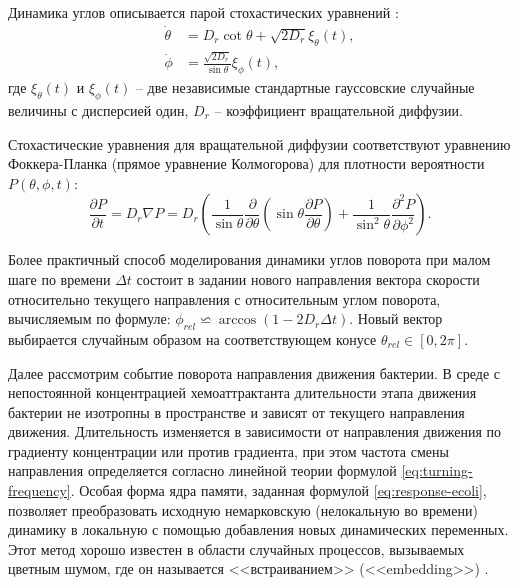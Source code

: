 Динамика углов описывается парой стохастических уравнений \cite{marino_dynamics_2019}:
\begin{equation}
    \begin{aligned}
	\dot{\theta} &= D_r\cot\theta +\sqrt{2D_r}\xi_{\theta}(t),\\
	\dot{\phi} &= \frac{\sqrt{2D_r}}{\sin\theta}\xi_{\phi}(t),
    \end{aligned}
    \label{eq:bacteria-angle-equations}
\end{equation}
где $\xi_{\theta}(t)$ и $\xi_{\phi}(t)$ -- две независимые стандартные гауссовские случайные величины с дисперсией один, $D_r$ -- коэффициент вращательной диффузии.

Стохастические уравнения для вращательной диффузии соответствуют уравнению Фоккера-Планка (прямое уравнение Колмогорова) для плотности вероятности $P(\theta,\phi,t)$:
\begin{equation}
	\frac{\partial P}{\partial t} = D_r \nabla P = 
	D_r \left ( \frac{1}{\sin \theta}\frac{\partial}{\partial \theta} \left (\sin\theta \frac{\partial P}{\partial \theta}\right ) + \frac{1}{\sin^2 \theta}\frac{\partial^2 P}{\partial \phi^2}\right ).
    \label{eq:foker-planck-angle-dynamics}
\end{equation}

Более практичный способ моделирования динамики углов поворота при малом шаге по времени $\Delta t$ состоит в задании нового направления вектора скорости относительно текущего направления с относительным углом поворота, вычисляемым по формуле: $\phi_{rel} \backsimeq \arccos{(1 - 2 D_r \Delta t)}$. Новый вектор выбирается случайным образом на соответствующем конусе $\theta_{rel} \in [0, 2\pi]$.

Далее рассмотрим событие поворота направления движения бактерии. В среде с непостоянной концентрацией хемоаттрактанта длительности этапа движения бактерии не изотропны в пространстве и зависят от текущего направления движения. Длительность изменяется в зависимости от направления движения по градиенту концентрации или против градиента, при этом частота смены направления определяется согласно линейной теории формулой \cref{eq:turning-frequency}. Особая форма ядра памяти, заданная формулой \cref{eq:response-ecoli}, позволяет преобразовать исходную немарковскую (нелокальную во времени) динамику в локальную с помощью добавления новых динамических переменных. Этот метод хорошо известен в области случайных процессов, вызываемых цветным шумом, где он называется <<встраиванием>> (<<embedding>>) \cite{xie_marine_2015,grabert_microdynamics_1977}.

